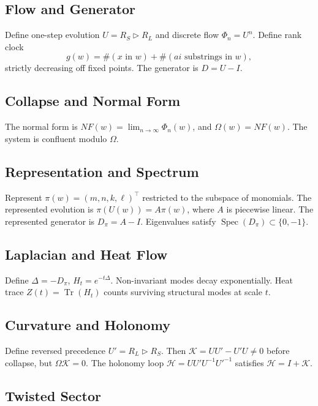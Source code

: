 \documentclass[12pt, oneside]{article}
\DeclareMathOperator{\Tr}{Tr}
\DeclareMathOperator{\Spec}{Spec}
\begin{document}
\subsection{Flow and Generator}

Define one-step evolution $U = R_S \triangleright R_L$ and discrete flow $\Phi_n = U^n$. Define rank clock
\[
g(w) = \#(x \text{ in } w) + \#(ai \text{ substrings in } w),
\]
strictly decreasing off fixed points. The generator is $D = U - I$.

\subsection{Collapse and Normal Form}

The normal form is $NF(w) = \lim_{n\to\infty} \Phi_n(w)$, and $\Omega(w) = NF(w)$. The system is confluent modulo $\Omega$.

\subsection{Representation and Spectrum}

Represent $\pi(w) = (m,n,k,\ell)^\top$ restricted to the subspace of monomials. The represented evolution is $\pi(U(w)) = A \pi(w)$, where $A$ is piecewise linear. The represented generator is $D_\pi = A - I$. Eigenvalues satisfy $\Spec(D_\pi) \subset \{0, -1\}$.

\subsection{Laplacian and Heat Flow}

Define $\Delta = -D_\pi$, $H_t = e^{-t\Delta}$. Non-invariant modes decay exponentially. Heat trace $Z(t) = \Tr(H_t)$ counts surviving structural modes at scale $t$.

\subsection{Curvature and Holonomy}

Define reversed precedence $U' = R_L \triangleright R_S$. Then $\mathcal{K} = U U' - U' U \neq 0$ before collapse, but $\Omega \mathcal{K} = 0$. The holonomy loop $\mathcal{H} = U U' U^{-1} U'^{-1}$ satisfies $\mathcal{H} = I + \mathcal{K}$.

\subsection{Twisted Sector}
\end{document}
